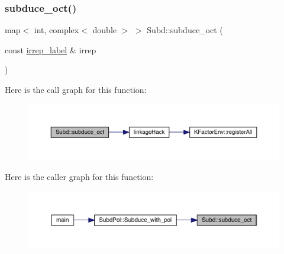 \subsubsection{\texorpdfstring{subduce\_oct()}{subduce\_oct()}}
{\footnotesize\ttfamily map$<$ int, complex$<$ double $>$ $>$ Subd\+::subduce\+\_\+oct (\begin{DoxyParamCaption}\item[{const \mbox{\hyperlink{structirrep__label}{irrep\+\_\+label}} \&}]{irrep }\end{DoxyParamCaption})}

Here is the call graph for this function\+:\nopagebreak
\begin{figure}[H]
\begin{center}
\leavevmode
\includegraphics[width=350pt]{d8/d2b/namespaceSubd_aa8b77162377de658856d44a4ac5aad26_cgraph}
\end{center}
\end{figure}
Here is the caller graph for this function\+:\nopagebreak
\begin{figure}[H]
\begin{center}
\leavevmode
\includegraphics[width=350pt]{d8/d2b/namespaceSubd_aa8b77162377de658856d44a4ac5aad26_icgraph}
\end{center}
\end{figure}

